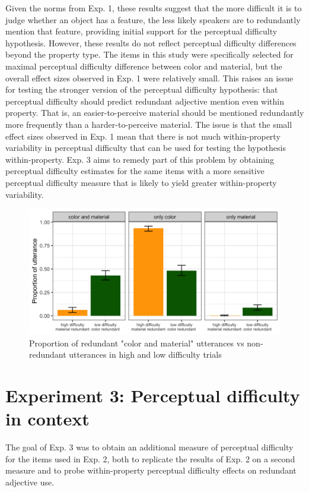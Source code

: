 \documentclass[12pt,letterpaper]{article}
\begin{document}
Given the norms from Exp. 1, these results suggest that the more difficult it is to judge whether an object has a feature, the less likely speakers are to redundantly mention that feature, providing initial support for the perceptual difficulty hypothesis. However, these results do not reflect perceptual difficulty differences beyond the property type. The items in this study were specifically selected for maximal perceptual difficulty difference between color and material, but the overall effect sizes observed in Exp. 1 were relatively small. This raises an issue for testing the stronger version of the perceptual difficulty hypothesis: that perceptual difficulty should predict redundant adjective mention even within property. That is, an easier-to-perceive material should be mentioned redundantly more frequently than a harder-to-perceive material. The issue is that the small effect sizes observed in Exp. 1 mean that there is not much within-property variability in perceptual difficulty that can be used for testing the hypothesis within-property. Exp. 3 aims to remedy part of this problem by obtaining perceptual difficulty estimates for the same items with a more sensitive perceptual difficulty measure that is likely to yield greater within-property variability.

\begin{figure}[ht]
\centering
\includegraphics[width=.8\textwidth]{plots/exp2_proportion.png}
\caption{Proportion of redundant "color and material" utterances vs non-redundant utterances in high and low difficulty trials}
\label{fig:exp2_proportion}
\end{figure}

\section{Experiment 3: Perceptual difficulty in context} 

The goal of Exp. 3 was to obtain an additional measure of perceptual difficulty for the items used in Exp. 2, both to replicate the results of Exp. 2 on a second measure and to probe within-property perceptual difficulty effects on redundant adjective use.
\end{document}
